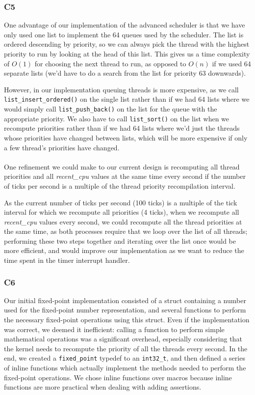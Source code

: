 \documentclass[a4wide, 11pt]{article}
\newcommand{\tx}{\texttt}
\begin{document}
\subsubsection{C5}

One advantage of our implementation of the advanced scheduler is that we have only used one list to implement the 64 queues used by the scheduler. The list is ordered descending by priority, so we can always pick the thread with the highest priority to run by looking at the head of this list. This gives us a time complexity of $O(1)$ for choosing the next thread to run, as opposed to $O(n)$ if we used 64 separate lists (we'd have to do a search from the list for priority $63$ downwards).

However, in our implementation queuing threads is more expensive, as we call \texttt{list\_insert\_ordered()} on the single list rather than if we had 64 lists where we would simply call \texttt{list\_push\_back()} on the list for the queue with the appropriate priority. We also have to call \texttt{list\_sort()} on the list when we recompute priorities rather than if we had 64 lists where we'd just the threads whose priorities have changed between lists, which will be more expensive if only a few thread's priorities have changed.
\\ \\
One refinement we could make to our current design is recomputing all thread priorities and all \textit{recent\_cpu} values at the same time every second if the number of ticks per second is a multiple of the thread priority recompilation interval.

As the current number of ticks per second (100 ticks) is a multiple of the tick interval for which we recompute all priorities (4 ticks), when we recompute all \textit{recent\_cpu} values every second, we could recompute all the thread priorities at the same time, as both processes require that we loop over the list of all threads; performing these two steps together and iterating over the list once would be more efficient, and would improve our implementation as we want to reduce the time spent in the timer interrupt handler.

\subsubsection{C6}

Our initial fixed-point implementation consisted of a struct containing a number used for the fixed-point number representation, and several functions to perform the necessary fixed-point operations using this struct. Even if the implementation was correct, we deemed it inefficient: calling a function to perform simple mathematical operations was a significant overhead, especially considering that the kernel needs to recompute the priority of all the threads every second. In the end, we created a \tx{fixed\_point} typedef to an \tx{int32\_t}, and then defined a series of inline functions which actually implement the methods needed to perform the fixed-point operations. We chose inline functions over macros because inline functions are more practical when dealing with adding assertions.
\end{document}
